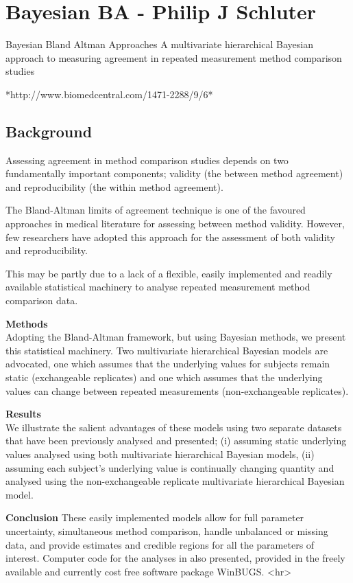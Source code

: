 \documentclass[]{article}
\begin{document}
\section*{Bayesian BA - Philip J Schluter}
Bayesian Bland Altman Approaches
A multivariate hierarchical Bayesian approach to measuring agreement in repeated
measurement method comparison studies

*http://www.biomedcentral.com/1471-2288/9/6*



\subsection*{Background}
Assessing agreement in method comparison studies depends on two fundamentally important components; validity (the between method agreement) and reproducibility (the within method agreement). 

The Bland-Altman limits of agreement technique is one of the favoured approaches in medical literature for assessing between method validity. However, few researchers have adopted this approach for the assessment of both validity and reproducibility. 

This may be partly due to a lack of a flexible, easily implemented and readily available statistical machinery to analyse repeated measurement method comparison data.

\textbf{Methods}\\
Adopting the Bland-Altman framework, but using Bayesian methods, we present this statistical machinery. Two multivariate hierarchical Bayesian models are advocated, one which assumes that the underlying values for subjects remain static (exchangeable replicates) and one which assumes that the underlying values can change between repeated measurements (non-exchangeable replicates).

\textbf{Results}\\
We illustrate the salient advantages of these models using two separate datasets that have been previously analysed and presented; 
(i) assuming static underlying values analysed using both multivariate hierarchical Bayesian models,  
(ii) assuming each subject's underlying value is continually changing quantity and analysed using the non-exchangeable replicate multivariate hierarchical Bayesian model.  

\textbf{Conclusion}
These easily implemented models allow for full parameter uncertainty, simultaneous method comparison, handle unbalanced or missing data, and provide estimates and credible regions for all the parameters of interest. Computer code for the analyses in also presented, provided in the freely available and currently cost free software package WinBUGS.
<hr>
\end{document}
